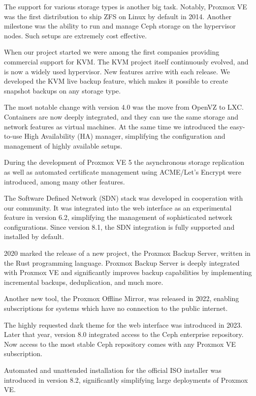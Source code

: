 The support for various storage types is another big task. Notably, Proxmox VE was the first distribution to ship ZFS on Linux by default in 2014. Another milestone was the ability to run and manage Ceph storage on the hypervisor nodes. Such setups are extremely cost effective.

When our project started we were among the first companies providing commercial support for KVM. The KVM project itself continuously evolved, and is now a widely used hypervisor. New features arrive with each release. We developed the KVM live backup feature, which makes it possible to create snapshot backups on any storage type.

The most notable change with version 4.0 was the move from OpenVZ to LXC. Containers are now deeply integrated, and they can use the same storage and network features as virtual machines. At the same time we introduced the easy-to-use High Availability (HA) manager, simplifying the configuration and management of highly available setups.

During the development of Proxmox VE 5 the asynchronous storage replication as well as automated certificate management using ACME/Let’s Encrypt were introduced, among many other features.

The Software Defined Network (SDN) stack was developed in cooperation with our community. It was integrated into the web interface as an experimental feature in version 6.2, simplifying the management of sophisticated network configurations. Since version 8.1, the SDN integration is fully supported and installed by default.

2020 marked the release of a new project, the Proxmox Backup Server, written in the Rust programming language. Proxmox Backup Server is deeply integrated with Proxmox VE and significantly improves backup capabilities by implementing incremental backups, deduplication, and much more.

Another new tool, the Proxmox Offline Mirror, was released in 2022, enabling subscriptions for systems which have no connection to the public internet.

The highly requested dark theme for the web interface was introduced in 2023. Later that year, version 8.0 integrated access to the Ceph enterprise repository. Now access to the most stable Ceph repository comes with any Proxmox VE subscription.

Automated and unattended installation for the official ISO installer was introduced in version 8.2, significantly simplifying large deployments of Proxmox VE.

